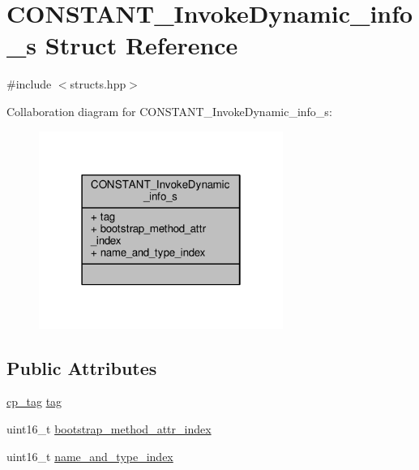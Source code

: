 \hypertarget{structCONSTANT__InvokeDynamic__info__s}{\section{C\+O\+N\+S\+T\+A\+N\+T\+\_\+\+Invoke\+Dynamic\+\_\+info\+\_\+s Struct Reference}
\label{structCONSTANT__InvokeDynamic__info__s}
}


{\ttfamily \#include $<$structs.\+hpp$>$}



Collaboration diagram for C\+O\+N\+S\+T\+A\+N\+T\+\_\+\+Invoke\+Dynamic\+\_\+info\+\_\+s\+:\nopagebreak
\begin{figure}[H]
\begin{center}
\leavevmode
\includegraphics[width=226pt]{structCONSTANT__InvokeDynamic__info__s__coll__graph}
\end{center}
\end{figure}
\subsection*{Public Attributes}
\begin{DoxyCompactItemize}
\item 
\hyperlink{structs_8hpp_a17947ec3f3c1f2392eabd36c1ba5fec6}{cp\+\_\+tag} \hyperlink{structCONSTANT__InvokeDynamic__info__s_a8e871033bfc2900cb240926b90f76449}{tag}
\item 
uint16\+\_\+t \hyperlink{structCONSTANT__InvokeDynamic__info__s_a1729eda16857b6fe2c266fd101335cb7}{bootstrap\+\_\+method\+\_\+attr\+\_\+index}
\item 
uint16\+\_\+t \hyperlink{structCONSTANT__InvokeDynamic__info__s_a8498bc18f2a985a82998a5d4d255a614}{name\+\_\+and\+\_\+type\+\_\+index}
\end{DoxyCompactItemize}


